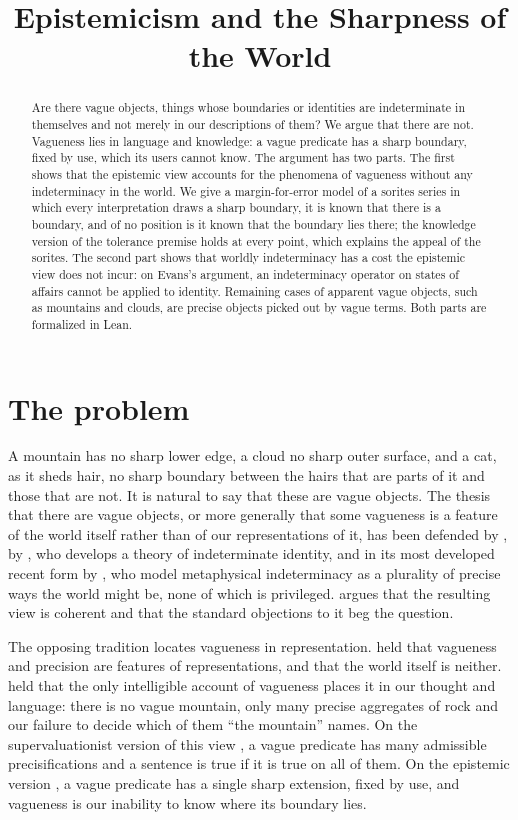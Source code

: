 \documentclass{situationist-preprint}
\title{Epistemicism and the Sharpness of the World}
\begin{document}
\maketitle

\begin{abstract}
Are there vague objects, things whose boundaries or identities are indeterminate in themselves and not merely in our descriptions of them? We argue that there are not. Vagueness lies in language and knowledge: a vague predicate has a sharp boundary, fixed by use, which its users cannot know. The argument has two parts. The first shows that the epistemic view accounts for the phenomena of vagueness without any indeterminacy in the world. We give a margin-for-error model of a sorites series in which every interpretation draws a sharp boundary, it is known that there is a boundary, and of no position is it known that the boundary lies there; the knowledge version of the tolerance premise holds at every point, which explains the appeal of the sorites. The second part shows that worldly indeterminacy has a cost the epistemic view does not incur: on Evans's argument, an indeterminacy operator on states of affairs cannot be applied to identity. Remaining cases of apparent vague objects, such as mountains and clouds, are precise objects picked out by vague terms. Both parts are formalized in Lean.
\end{abstract}

\section{The problem}

A mountain has no sharp lower edge, a cloud no sharp outer surface, and a cat, as it sheds hair, no sharp boundary between the hairs that are parts of it and those that are not. It is natural to say that these are vague objects. The thesis that there are vague objects, or more generally that some vagueness is a feature of the world itself rather than of our representations of it, has been defended by \citet{Tye1990}, by \citet{Parsons2000}, who develops a theory of indeterminate identity, and in its most developed recent form by \citet{BarnesWilliams2011}, who model metaphysical indeterminacy as a plurality of precise ways the world might be, none of which is privileged. \citet{Barnes2010} argues that the resulting view is coherent and that the standard objections to it beg the question.

The opposing tradition locates vagueness in representation. \citet{Russell1923} held that vagueness and precision are features of representations, and that the world itself is neither. \citet{Lewis1986} held that the only intelligible account of vagueness places it in our thought and language: there is no vague mountain, only many precise aggregates of rock and our failure to decide which of them \enquote{the mountain} names. On the supervaluationist version of this view \citep{Fine1975,Keefe2000}, a vague predicate has many admissible precisifications and a sentence is true if it is true on all of them. On the epistemic version \citep{Sorensen1988,Williamson1994}, a vague predicate has a single sharp extension, fixed by use, and vagueness is our inability to know where its boundary lies.
\end{document}
